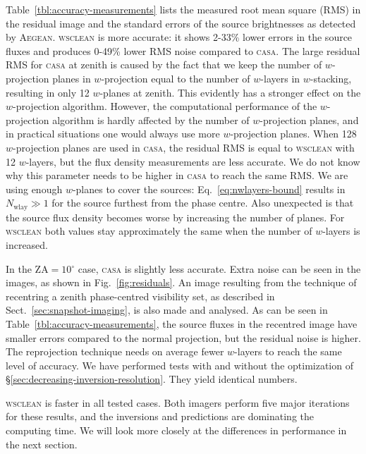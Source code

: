 \documentclass[useAMS,usenatbib]{mn2e}
\newcommand{\degree}{\ensuremath{^{\circ}}\xspace}
\begin{document}
Table~\ref{tbl:accuracy-measurements} lists the measured root mean square (RMS) in the residual image and the standard errors of the source brightnesses as detected by \textsc{Aegean}. \textsc{wsclean} is more accurate: it shows 2-33\% lower errors in the source fluxes and produces 0-49\% lower RMS noise compared to \textsc{casa}. The large residual RMS for \textsc{casa} at zenith is caused by the fact that we keep the number of $w$-projection planes in $w$-projection equal to the number of $w$-layers in $w$-stacking, resulting in only 12 $w$-planes at zenith. This evidently has a stronger effect on the $w$-projection algorithm. However, the computational performance of the $w$-projection algorithm is hardly affected by the number of $w$-projection planes, and in practical situations one would always use more $w$-projection planes. When 128 $w$-projection planes are used in \textsc{casa}, the residual RMS is equal to \textsc{wsclean} with 12 $w$-layers, but the flux density measurements are less accurate. We do not know why this parameter needs to be higher in \textsc{casa} to reach the same RMS. We are using enough $w$-planes to cover the sources: Eq.~\eqref{eq:nwlayers-bound} results in $N_\textrm{wlay}\gg 1$ for the source furthest from the phase centre. Also unexpected is that the source flux density becomes worse by increasing the number of planes. For \textsc{wsclean} both values stay approximately the same when the number of $w$-layers is increased.

In the $\textrm{ZA}=10\degree$ case, \textsc{casa} is slightly less accurate. Extra noise can be seen in the images, as shown in Fig.~\ref{fig:residuals}. An image resulting from the technique of recentring a zenith phase-centred visibility set, as described in Sect.~\ref{sec:snapshot-imaging}, is also made and analysed. As can be seen in Table~\ref{tbl:accuracy-measurements}, the source fluxes in the recentred image have smaller errors compared to the normal projection, but the residual noise is higher. The reprojection technique needs on average fewer $w$-layers to reach the same level of accuracy. We have performed tests with and without the optimization of \S\ref{sec:decreasing-inversion-resolution}. They yield identical numbers.

\textsc{wsclean} is faster in all tested cases. Both imagers perform five major iterations for these results, and the inversions and predictions are dominating the computing time. We will look more closely at the differences in performance in the next section.
\end{document}

